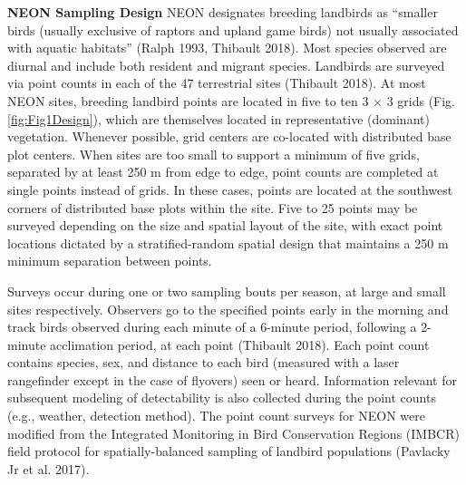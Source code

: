 \documentclass[
  12pt,
]{article}
\begin{document}
\textbf{NEON Sampling Design} NEON designates breeding landbirds as ``smaller birds (usually exclusive of raptors and upland game birds) not usually associated with aquatic habitats'' (Ralph 1993, Thibault 2018). Most species observed are diurnal and include both resident and migrant species. Landbirds are surveyed via point counts in each of the 47 terrestrial sites (Thibault 2018). At most NEON sites, breeding landbird points are located in five to ten 3 \(\times\) 3 grids (Fig. \ref{fig:Fig1Design}), which are themselves located in representative (dominant) vegetation. Whenever possible, grid centers are co-located with distributed base plot centers. When sites are too small to support a minimum of five grids, separated by at least 250 m from edge to edge, point counts are completed at single points instead of grids. In these cases, points are located at the southwest corners of distributed base plots within the site. Five to 25 points may be surveyed depending on the size and spatial layout of the site, with exact point locations dictated by a stratified-random spatial design that maintains a 250 m minimum separation between points.

Surveys occur during one or two sampling bouts per season, at large and small sites respectively. Observers go to the specified points early in the morning and track birds observed during each minute of a 6-minute period, following a 2-minute acclimation period, at each point (Thibault 2018). Each point count contains species, sex, and distance to each bird (measured with a laser rangefinder except in the case of flyovers) seen or heard. Information relevant for subsequent modeling of detectability is also collected during the point counts (e.g., weather, detection method). The point count surveys for NEON were modified from the Integrated Monitoring in Bird Conservation Regions (IMBCR) field protocol for spatially-balanced sampling of landbird populations (Pavlacky Jr et al. 2017).
\end{document}
